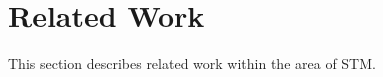 \makeatletter {}\makeatother
{}

\section{Related Work}
This section describes related work within the area of \ac{STM}. 
\worksheetend